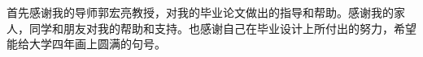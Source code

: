 \documentclass{standalone}
\begin{document}
\thesisacknowledgement
首先感谢我的导师郭宏亮教授，对我的毕业论文做出的指导和帮助。感谢我的家人，同学和朋友对我的帮助和支持。也感谢自己在毕业设计上所付出的努力，希望能给大学四年画上圆满的句号。
\end{document}
